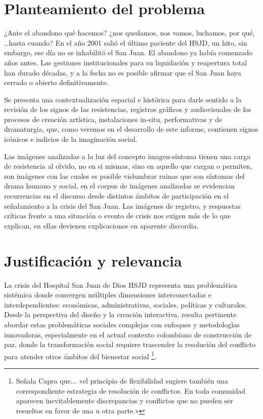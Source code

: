 \section*{Planteamiento del problema }
¿Ante el abandono qué hacemos? ¿nos quedamos, nos vamos, luchamos, por qué, …hasta cuando? En el año 2001 salió el último paciente del HSJD, un hito, sin embargo, ese día no se inhabilitó el San Juan. El abandono ya había comenzado años antes. Las gestiones institucionales para su liquidación y reapertura total han durado décadas, y a la fecha no es posible afirmar que el San Juan haya cerrado o abierto definitivamente.

Se presenta una contextualización espacial e histórica para darle sentido a la revisión de los signos de las resistencias, registros gráficos y audiovisuales de los procesos de creación artística, instalaciones in-situ, performativas y de dramaturgia, que, como veremos en el desarrollo de este informe, contienen signos icónicos e indicios de la imaginación social.

Las imágenes analizadas a la luz del concepto imagen-síntoma tienen una carga de resistencia al olvido, no en si mismas, sino en aquello que cargan o permiten, son imágenes con las cuales es posible vislumbrar ruinas que son síntomas del drama humano y social, en el corpus de imágenes analizadas se evidencian recurrencias en el discurso desde distintos ámbitos de participación en el señalamiento a la crisis del San Juan. Las imágenes de registro, y respuestas críticas frente a una situación o evento de crisis nos exigen más de lo que explican, en ellas devienen explicaciones en aparente discordia.


\section*{Justificación y relevancia}
La crisis del Hospital San Juan de Dios HSJD representa una problemática sistémica donde convergen múltiples dimensiones interconectadas e interdependientes: económicas, administrativas, sociales, políticas y culturales. Desde la perspectiva del diseño y la creación interactiva, resulta pertinente abordar estas problemáticas sociales complejas con enfoques y metodologìas innovadoras, especialmente en el actual contexto colombiano de construcción de paz, donde la transformación social requiere trascender la resolución del conflicto para atender otros ámbitos del bienestar social \parencite[p. 313]{Capra1998}\footnote{Señala Capra que... «el principio de flexibilidad sugiere también una correspondiente estrategia de resolución de conflictos. En toda comunidad aparecen inevitablemente discrepancias y conflictos que no pueden ser resueltos en favor de una u otra parte.»}.


